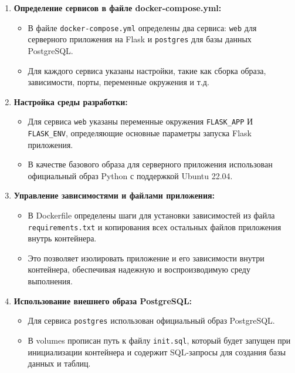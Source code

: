\documentclass[12pt, russian]{extarticle}
\begin{document}
\begin{spacing}{1.5}
    \begin{enumerate}
        \item \textbf{Определение сервисов в файле docker-compose.yml:}
        \begin{itemize}
            \item В файле \texttt{docker-compose.yml} определены два сервиса: \texttt{web}
                для серверного приложения на Flask и \texttt{postgres} для базы данных PostgreSQL.
            \item Для каждого сервиса указаны настройки, такие как сборка образа, зависимости, порты,
                переменные окружения и т.д.
        \end{itemize}
        \item \textbf{Настройка среды разработки:}
        \begin{itemize}
            \item Для сервиса \texttt{web} указаны переменные окружения \texttt{FLASK\_APP} И
                \texttt{FLASK\_ENV}, определяющие основные параметры запуска Flask приложения.
            \item В качестве базового образа для серверного приложения использован официальный образ
                Python с поддержкой Ubuntu 22.04.
        \end{itemize}
        \item \textbf{Управление зависимостями и файлами приложения:}
        \begin{itemize}
            \item В Dockerfile определены шаги для установки зависимостей из файла \\
                \texttt{requirements.txt} и копирования всех остальных файлов приложения внутрь контейнера.
            \item Это позволяет изолировать приложение и его зависимости внутри контейнера,
                обеспечивая надежную и воспроизводимую среду выполнения.
        \end{itemize}
        \item \textbf{Использование внешнего образа PostgreSQL:}
        \begin{itemize}
            \item Для сервиса \texttt{postgres} использован официальный образ PostgreSQL.
            \item В volumes прописан путь к файлу \texttt{init.sql}, который будет запущен при
                инициализации контейнера и содержит SQL-запросы для создания базы данных и таблиц.

\end{itemize}
\end{enumerate}
\end{spacing}
\end{document}
